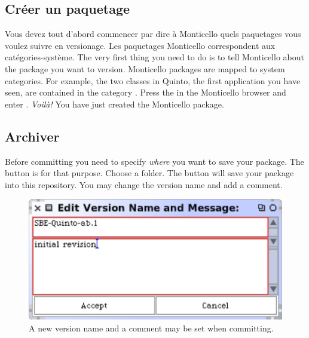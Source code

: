 \documentclass[a4paper,10pt,twoside]{book}
\begin{document}
\subsection{Cr\'eer un paquetage}

Vous devez tout d'abord commencer par dire \`a Monticello quels
paquetages vous voulez suivre en versionage. Les paquetages Monticello
correspondent aux cat\'egories-syst\`eme.
The very first thing you need to do is to tell Monticello about the package you want to version. Monticello packages are mapped to system categories. For example, the two classes in Quinto, the first application you have seen, are contained in the category . Press the  in the Monticello browser and enter . \emph{Voil\`a!} You have just created the  Monticello package. 

\subsection{Archiver} %

Before committing you need to specify \emph{where} you want to save your package. The  button is for that purpose. Choose a folder.   The  button will save your package into this repository. You may change the version name and add a comment. 

\begin{figure}[ht]\centering
	\includegraphics[width=.55\linewidth]{saving.png}
	\caption{A new version name and a comment may be set when committing.}
\end{figure}
\end{document}
